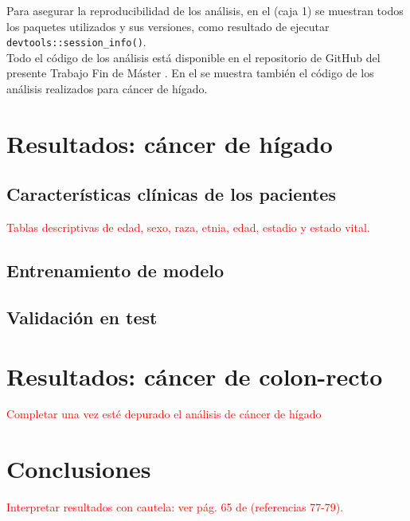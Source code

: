 Para asegurar la reproducibilidad de los análisis, en el  (caja 1) se muestran todos los paquetes utilizados y sus versiones, como resultado de ejecutar \texttt{devtools::session\_info()}.\\

Todo el código de los análisis está disponible en el repositorio de GitHub del presente Trabajo Fin de Máster \cite{Redondo-Sanchez2020}. En el  se muestra también el código de los análisis realizados para cáncer de hígado.

\section{Resultados: cáncer de hígado}

\subsection{Características clínicas de los pacientes}

\textcolor{red}{Tablas descriptivas de edad, sexo, raza, etnia, edad, estadio y estado vital.}

\subsection{Entrenamiento de modelo}

\subsection{Validación en test}

\section{Resultados: cáncer de colon-recto}

\textcolor{red}{Completar una vez esté depurado el análisis de cáncer de hígado}

\section{Conclusiones}

\textcolor{red}{Interpretar resultados con cautela: ver pág. 65 de \cite{CastilloSecilla2020} (referencias 77-79).}\\
